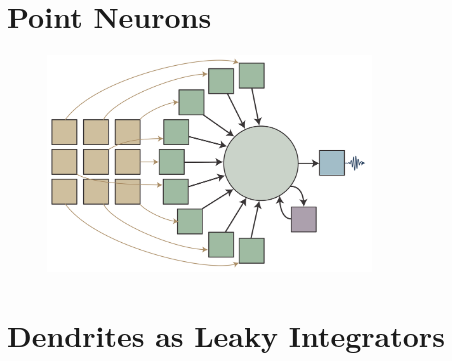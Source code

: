 \documentclass[twocolumn]{article}
\begin{document}
\section{\label{sec:point_neurons}Point Neurons}

\begin{figure}[h!]
\includegraphics[width=8.6cm]{figures/_06__point_neuron__nine_pixel_schematic.pdf}
\end{figure}
 

\section{\label{sec:dendrites}Dendrites as Leaky Integrators}
% 

 
\end{document}
